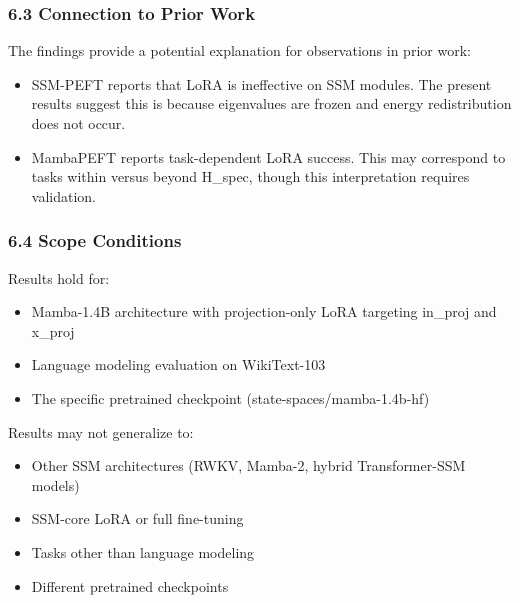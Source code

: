 \subsubsection{6.3 Connection to Prior Work}

The findings provide a potential explanation for observations in prior work:

\begin{itemize}
\item SSM-PEFT reports that LoRA is ineffective on SSM modules. The present results suggest this is because eigenvalues are frozen and energy redistribution does not occur.
\item MambaPEFT reports task-dependent LoRA success. This may correspond to tasks within versus beyond H\_spec, though this interpretation requires validation.
\end{itemize}

\subsubsection{6.4 Scope Conditions}

Results hold for:
\begin{itemize}
\item Mamba-1.4B architecture with projection-only LoRA targeting in\_proj and x\_proj
\item Language modeling evaluation on WikiText-103
\item The specific pretrained checkpoint (state-spaces/mamba-1.4b-hf)
\end{itemize}

Results may not generalize to:
\begin{itemize}
\item Other SSM architectures (RWKV, Mamba-2, hybrid Transformer-SSM models)
\item SSM-core LoRA or full fine-tuning
\item Tasks other than language modeling
\item Different pretrained checkpoints
\end{itemize}
